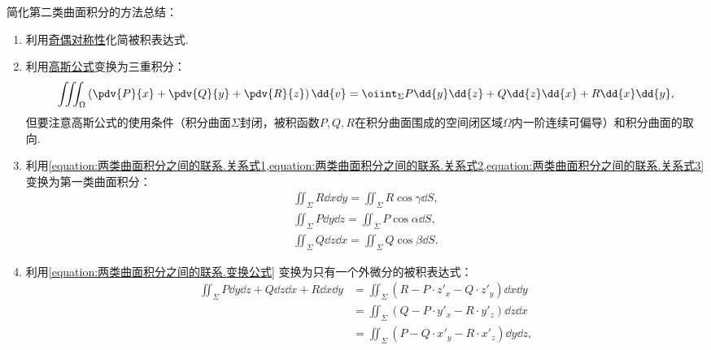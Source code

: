 简化第二类曲面积分的方法总结：\begin{enumerate}
	\item 利用\hyperref[section:线积分与面积分.利用对称性简化第二类曲面积分的计算]{奇偶对称性}化简被积表达式.

	\item 利用\hyperref[equation:线积分与面积分.高斯公式]{高斯公式}变换为三重积分：\begin{equation*}
		\iiint_\Omega \left(\pdv{P}{x}+\pdv{Q}{y}+\pdv{R}{z}\right)\dd{v}
		= \oiint_\Sigma P\dd{y}\dd{z}+Q\dd{z}\dd{x}+R\dd{x}\dd{y},
	\end{equation*}
	但要注意高斯公式的使用条件（积分曲面\(\Sigma\)封闭，被积函数\(P,Q,R\)在积分曲面围成的空间闭区域\(\Omega\)内一阶连续可偏导）和积分曲面的取向.

	\item 利用\cref{equation:两类曲面积分之间的联系.关系式1,equation:两类曲面积分之间的联系.关系式2,equation:两类曲面积分之间的联系.关系式3}
	变换为第一类曲面积分：\begin{gather*}
		\iint_\Sigma R \dd{x}\dd{y}
		= \iint_\Sigma R \cos\gamma \dd{S}, \\
		\iint_\Sigma P \dd{y}\dd{z}
		= \iint_\Sigma P \cos\alpha \dd{S}, \\
		\iint_\Sigma Q \dd{z}\dd{x}
		= \iint_\Sigma Q \cos\beta \dd{S}.
	\end{gather*}

	\item 利用\cref{equation:两类曲面积分之间的联系.变换公式}
	变换为只有一个外微分的被积表达式：\begin{align*}
		\iint_\Sigma P\dd{y}\dd{z}+Q\dd{z}\dd{x}+R\dd{x}\dd{y}
		&= \iint_\Sigma \left(R - P \cdot z'_x - Q \cdot z'_y\right)\dd{x}\dd{y} \\
		&= \iint_\Sigma \left(Q - P \cdot y'_x - R \cdot y'_z\right)\dd{z}\dd{x} \\
		&= \iint_\Sigma \left(P - Q \cdot x'_y - R \cdot x'_z\right)\dd{y}\dd{z},
	\end{align*}
\end{enumerate}
